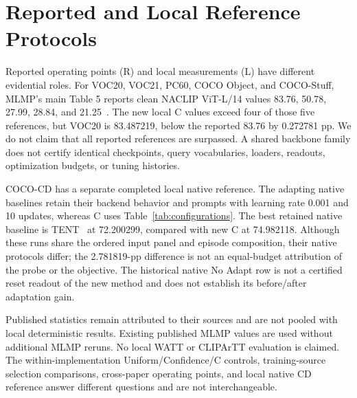 \section{Reported and Local Reference Protocols}
\label{app:native}
Reported operating points (R) and local measurements (L) have different evidential roles. For VOC20, VOC21, PC60, COCO Object, and COCO-Stuff, MLMP's main Table 5 reports clean NACLIP ViT-L/14 values 83.76, 50.78, 27.99, 28.84, and 21.25~\cite{noori2025mlmp}. The new local C values exceed four of those five references, but VOC20 is 83.487219, below the reported 83.76 by 0.272781 pp. We do not claim that all reported references are surpassed. A shared backbone family does not certify identical checkpoints, query vocabularies, loaders, readouts, optimization budgets, or tuning histories.

COCO-CD has a separate completed local native reference. The adapting native baselines retain their backend behavior and prompts with learning rate 0.001 and 10 updates, whereas C uses Table~\ref{tab:configurations}. The best retained native baseline is TENT~\cite{wang2021tent} at 72.200299, compared with new C at 74.982118. Although these runs share the ordered input panel and episode composition, their native protocols differ; the 2.781819-pp difference is not an equal-budget attribution of the probe or the objective. The historical native No Adapt row is not a certified reset readout of the new method and does not establish its before/after adaptation gain.

Published statistics remain attributed to their sources and are not pooled with local deterministic results. Existing published MLMP values are used without additional MLMP reruns. No local WATT or CLIPArTT evaluation is claimed. The within-implementation Uniform/Confidence/C controls, training-source selection comparisons, cross-paper operating points, and local native CD reference answer different questions and are not interchangeable.

